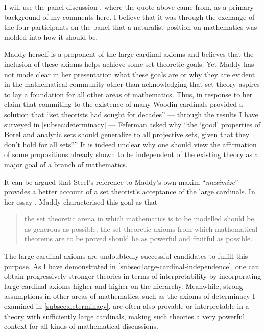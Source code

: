 \documentclass[12pt]{article}
\theoremstyle{plain}
\theoremstyle{definition}
\begin{document}
I will use the panel discussion \cite{new-axioms-panel}, where the quote above came from, as a primary background of my comments here. I believe that it was through the exchange of the four participants on the panel that a naturalist position on mathematics was molded into how it should be.

Maddy herself is a proponent of the large cardinal axioms and believes that the inclusion of these axioms helps achieve some set-theoretic goals. Yet Maddy has not made clear in her presentation what these goals are or why they are evident in the mathematical community other than acknowledging that set theory aspires to lay a foundation for all other areas of mathematics. Thus, in response to her claim that commiting to the existence of many Woodin cardinals provided a solution that ``set theorists had sought for decades'' --- through the results I have surveyed in \autoref{subsec:determinacy} --- Feferman asked why ``the `good' properties of Borel and analytic sets should generalize to all projective sets, given that they don't hold for all sets?'' It is indeed unclear why one should view the affirmation of some propositions already shown to be independent of the existing theory as a major goal of a branch of mathematics.

It can be argued that Steel's reference to Maddy's own maxim ``\emph{maximize}'' provides a better account of a set theorist's acceptance of the large cardinals. In her essay \cite{maddy-maximize}, Maddy characterised this goal as that

\begin{quote}
	the set theoretic arena in which mathematics is to be modelled should be as generous as possible; the set theoretic axioms from which mathematical theorems are to be proved should be as powerful and fruitful as possible.
\end{quote}

The large cardinal axioms are undoubtedly successful candidates to fulfill this purpose. As I have demonstrated in \autoref{subsec:large-cardinal-independence}, one can obtain progressively stronger theories in terms of interpretability by incorporating large cardinal axioms higher and higher on the hierarchy. Meanwhile, strong assumptions in other areas of mathematics, such as the axioms of determinacy I examined in \autoref{subsec:determinacy}, are often also provable or interpretable in a theory with sufficiently large cardinals, making such theories a very powerful context for all kinds of mathematical discussions.
\end{document}
